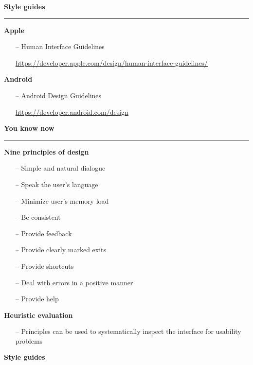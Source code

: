 \documentclass[pdf]{beamer}
\begin{document}
\begin{frame}
{\textbf{Style guides}}{\textcolor{red}{\rule{12cm}{1.2pt}}}

  	\textbf{Apple}
	\begin{itemize}
		\item[--] Human Interface Guidelines

		\url{https://developer.apple.com/design/human-interface-guidelines/}
				
    \end{itemize}
       
  	\textbf{Android}
	\begin{itemize}
		\item[--] Android Design Guidelines
		
		\url{https://developer.android.com/design}
    \end{itemize}

\end{frame}



\begin{frame}
{\textbf{You know now}}{\textcolor{red}{\rule{12cm}{1.2pt}}}

  	\textbf{Nine principles of design}
	\begin{itemize}
		\item[--] {Simple and natural dialogue}
        \item[--] {Speak the user's language}
        \item[--] {Minimize user's memory load}
        \item[--] {Be consistent}
        \item[--] {Provide feedback}
        \item[--] {Provide clearly marked exits}
        \item[--] {Provide shortcuts}
        \item[--] {Deal with errors in a positive manner}
        \item[--] {Provide help}
    \end{itemize}

    \textbf{Heuristic evaluation}
	\begin{itemize}
		\item[--] {Principles can be used to systematically inspect the interface for usability problems}
    \end{itemize}

    \textbf{Style guides}
\end{frame}
\end{document}

